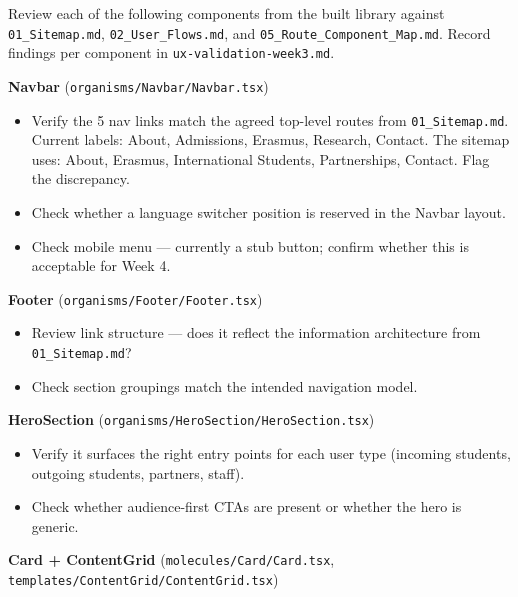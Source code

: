 \documentclass[12pt,a4paper]{article}
\begin{document}
Review each of the following components from the built library against \texttt{01\_Sitemap.md},
\texttt{02\_User\_Flows.md}, and \texttt{05\_Route\_Component\_Map.md}. Record findings per component
in \texttt{ux-validation-week3.md}.

\vspace{0.8em}
\noindent\textbf{Navbar} (\texttt{organisms/Navbar/Navbar.tsx})

\begin{itemize}
    \item[$\square$] Verify the 5 nav links match the agreed top-level routes from \texttt{01\_Sitemap.md}. Current labels: About, Admissions, Erasmus, Research, Contact. The sitemap uses: About, Erasmus, International Students, Partnerships, Contact. Flag the discrepancy.
    \item[$\square$] Check whether a language switcher position is reserved in the Navbar layout.
    \item[$\square$] Check mobile menu --- currently a stub button; confirm whether this is acceptable for Week 4.
\end{itemize}

\vspace{0.8em}
\noindent\textbf{Footer} (\texttt{organisms/Footer/Footer.tsx})

\begin{itemize}
    \item[$\square$] Review link structure --- does it reflect the information architecture from \texttt{01\_Sitemap.md}?
    \item[$\square$] Check section groupings match the intended navigation model.
\end{itemize}

\vspace{0.8em}
\noindent\textbf{HeroSection} (\texttt{organisms/HeroSection/HeroSection.tsx})

\begin{itemize}
    \item[$\square$] Verify it surfaces the right entry points for each user type (incoming students, outgoing students, partners, staff).
    \item[$\square$] Check whether audience-first CTAs are present or whether the hero is generic.
\end{itemize}

\vspace{0.8em}
\noindent\textbf{Card + ContentGrid} (\texttt{molecules/Card/Card.tsx}, \texttt{templates/ContentGrid/ContentGrid.tsx})
\end{document}
